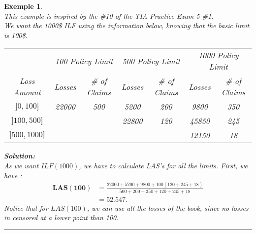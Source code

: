 \documentclass[11pt, english]{memoir}
\numberwithin{definition}{section}
\newtheorem{example}{Exemple}[section]
\newenvironment{exemple}
{
	\begin{example} \normalfont \ \\[5pt] 
	}
	{
		\hfill\rule{0.5em}{0.5em}\end{example}
}
\newenvironment{solution}
{\noindent\textbf{Solution:} \\[5pt] 
}{
}
\begin{document}
\begin{exemple}
	This example is inspired by the \#10 of the TIA Practice Exam 5 \#1. \\
	We want the 1000\$ \emph{ILF} using the information below, knowing that the basic limit is 100\$. 
	
	\begin{tabularx}{0.88\linewidth}{c|cc|cc|cc}
		\toprule
		\multicolumn{1}{c}{}& \multicolumn{2}{c}{100 Policy Limit} & \multicolumn{2}{c}{500 Policy Limit} & \multicolumn{2}{c}{1000 Policy Limit} \\
		Loss Amount & Losses & \# of Claims & Losses & \# of Claims & Losses & \# of Claims\\
		\midrule
		$ ]0, 100] $ 	& 22000 & 500 	& 5200	 	& 200 	& 9800 		& 350\\
		$ ]100, 500] $ 	&  		&  		& 22800 	& 120 	& 45850 	& 245\\
		$ ]500, 1000]$ 	&  		&  		& 		 	& 	 	& 12150 	& 18\\
		\bottomrule
	\end{tabularx}

	\begin{solution}
		As we want $ ILF(1000) $, we have to calculate \emph{LAS}'s for all the limits. First, we have : 
		\begin{align*}
		\mathbf{LAS(100)} 	&= \frac{22000 + 5200 + 9800 + 100(120 + 245 + 18)}{500 + 200 + 350 + 120 + 245 + 18}\\
					&= 52.547.
		\end{align*}
		Notice that for $ LAS(100) $, we can use all the losses of the book, since no losses in censored at a lower point than 100. 
		

\end{solution}
\end{exemple}
\end{document}
